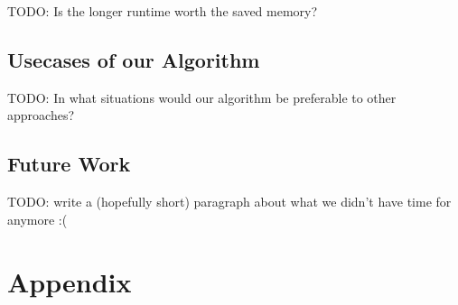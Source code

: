 \documentclass[12pt,a4paper,twoside]{scrartcl}
\numberwithin{equation}{section}
\begin{document}
TODO: Is the longer runtime worth the saved memory?

\subsection{Usecases of our Algorithm}

TODO: In what situations would our algorithm be preferable to other approaches?

\subsection{Future Work}

TODO: write a (hopefully short) paragraph about what we didn't have time for anymore :(


\clearpage


\section{Appendix}
\end{document}

